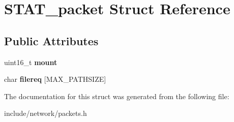 \hypertarget{structSTAT__packet}{\section{\-S\-T\-A\-T\-\_\-packet \-Struct \-Reference}
\label{d0/d26/structSTAT__packet}
}
\subsection*{\-Public \-Attributes}
\begin{DoxyCompactItemize}
\item 
\hypertarget{structSTAT__packet_ad6962f4247e0ec11279a5c7fb681e5e7}{uint16\-\_\-t {\bfseries mount}}\label{d0/d26/structSTAT__packet_ad6962f4247e0ec11279a5c7fb681e5e7}

\item 
\hypertarget{structSTAT__packet_a700f76ff727071755a7ed52e9308adb4}{char {\bfseries filereq} \mbox{[}\-M\-A\-X\-\_\-\-P\-A\-T\-H\-S\-I\-Z\-E\mbox{]}}\label{d0/d26/structSTAT__packet_a700f76ff727071755a7ed52e9308adb4}

\end{DoxyCompactItemize}


\-The documentation for this struct was generated from the following file\-:\begin{DoxyCompactItemize}
\item 
include/network/packets.\-h\end{DoxyCompactItemize}
